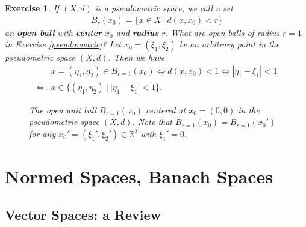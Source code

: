 \documentclass[11pt]{article}
\theoremstyle{mystyle}
\newtheorem{protoexer}{Exercise}[section]
\newenvironment{exer}
{\colorlet{shadecolor}{blue!15}\begin{shaded}\begin{protoexer}}
{\end{protoexer}\end{shaded}}
\newcommand{\0}{\mathbf{0}}
\begin{document}
\begin{exer}
If $(X, d)$ is a pseudometric space, we call a set 
\begin{align*}
    B_r(x_0) = \{ x\in X \ | \ d(x, x_0) < r\}
\end{align*}
an \textbf{open ball} with \textbf{center} $x_0$ and \textbf{radius} $r$. What are open balls of radius $r=1$ in Exercise \ref{pseudometric}?\newline
Let $x_0 = (\xi_1, \xi_2)$ be an arbitrary point in the pseudometric space $(X,d)$. Then we have
\begin{align*}
   &x = (\eta_1, \eta_2) \in B_{r=1}(x_0) \iff d(x, x_0) < 1 \iff |\eta_1 - \xi_1| < 1\\
   \iff& x \in \{(\eta_1, \eta_2) \ | \ |\eta_1 - \xi_1 | < 1 \}.
\end{align*}

\begin{figure}[H]
\begin{center}
\end{center}
\caption*{The open unit ball $B_{r=1}(x_0)$ centered at $x_0 = (0, 0)$ in the pseudometric space $(X,d)$. Note that $B_{r=1}(x_0) = B_{r=1}(x_0')$ for any $x_0' = (\xi_1', \xi_2') \in \mathbb{R}^2$ with $\xi_1' = 0$.}
\end{figure}
\end{exer}

\section{Normed Spaces, Banach Spaces}
\subsection{Vector Spaces: a Review}\label{vectorspace}
\end{document}
